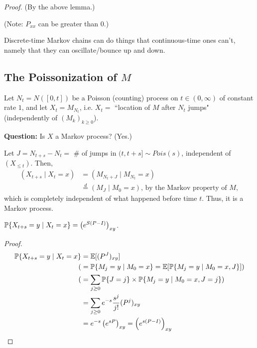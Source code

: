 \documentclass[12pt]{article}
\begin{document}
\noindent\textit{Proof.} (By the above lemma.)

\noindent(Note: $P_{xx}$ can be greater than $0$.)

Discrete-time Markov chains can do things that continuous-time ones can't, namely that they can oscillate/bounce up and down.

\subsection*{The Poissonization of $M$}
\begin{exmp}[]

Let $N_t = N([0,t])$ be a Poisson (counting) process on $t\in(0,\infty)$ of constant rate $1$, and let $X_t=M_{N_t}$, i.e. $X_t=$ ``location of $M$ after $N_t$ jumps" (independently of $(M_k)_{k\geq 0}$).

\noindent\textbf{Question:} Is $X$ a Markov process? (Yes.)

\begin{sol} Let $J = N_{t+s} - N_t = $ \# of jumps in $(t, t+s] \sim Pois(s)$, independent of $(X_{\leq t})$. Then,
$$\begin{aligned}
	(X_{t+s} \mid X_t = x) &= (M_{N_t + J} \mid M_{N_t} = x)\\
	&\stackrel{d}{=} (M_J \mid M_0 = x) \text{, by the Markov property of } M,
\end{aligned}$$
which is completely independent of what happened before time $t$. Thus, it is a Markov process.
\end{sol}
\end{exmp}

\begin{coro} $\P\{X_{t+s}=y \mid X_t = x \} = \left( e^{S(P-I)} \right)_{xy}$.
\end{coro}

\begin{proof} 
$$\begin{aligned}
\P\{X_{t+s}=y \mid X_t = x \} &= \E[(P^J)_{xy}] \\
	( &= \P\{M_j=y \mid M_0=x \} = \E[\P\{M_j=y \mid M_0=x, J \}] ) \\
	( &= \sum_{j\geq0} \P\{J=j\} \times \P\{M_j=y \mid M_0=x, J=j\} ) \\
	&= \sum_{j\geq0} e^{-s} \frac{s^j}{j!} (P^j)_{xy} \\
	&= e^{-s}\left(e^{sP} \right)_{xy} = \left( e^{s(P-I)} \right)_{xy}
\end{aligned}$$
\end{proof}
\end{document}
